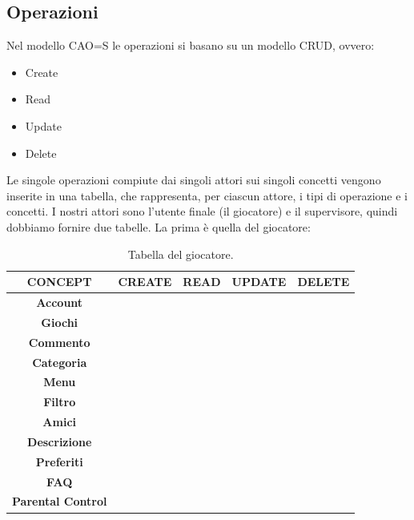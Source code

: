 \documentclass[../Report.tex]{subfiles}
\begin{document}
    \subsection{Operazioni}
    Nel modello CAO=S le operazioni si basano su un modello CRUD, ovvero:
    \begin{itemize}
        \item Create
        \item Read
        \item Update
        \item Delete
    \end{itemize}
    Le singole operazioni compiute dai singoli attori sui singoli concetti vengono inserite in una tabella, che rappresenta, per ciascun attore, i tipi di operazione e i concetti. I nostri attori sono l'utente finale (il giocatore) e il supervisore, quindi dobbiamo fornire due tabelle. La prima è quella del giocatore:

    \begin{table}[H]
        \begin{tabular}{|c|c|c|c|c|}
            \hline
            \textbf{CONCEPT} & \textbf{CREATE} & \textbf{READ} & \textbf{UPDATE} & \textbf{DELETE} \\
            \hline
            \textbf{Account} & \cellcolor{gray} & \cellcolor{gray} & \cellcolor{gray} & \cellcolor{gray}\\
            \hline
            \textbf{Giochi} & \cellcolor{red} & \cellcolor{green} & \cellcolor{red} & \cellcolor{red} \\
            \hline
            \textbf{Commento} & \cellcolor{gray} & \cellcolor{gray} & \cellcolor{gray} & \cellcolor{gray} \\
            \hline
            \textbf{Categoria} & \cellcolor{red} & \cellcolor{green} & \cellcolor{red} & \cellcolor{red} \\
            \hline
            \textbf{Menu} & \cellcolor{red} & \cellcolor{green} & \cellcolor{red} & \cellcolor{red} \\
            \hline
            \textbf{Filtro} & \cellcolor{red} & \cellcolor{green} & \cellcolor{green} & \cellcolor{red} \\
            \hline
            \textbf{Amici} & \cellcolor{gray} & \cellcolor{gray} & \cellcolor{red} & \cellcolor{gray} \\
            \hline
            \textbf{Descrizione} & \cellcolor{red} & \cellcolor{gray} & \cellcolor{red} & \cellcolor{red} \\
            \hline
            \textbf{Preferiti} & \cellcolor{red} & \cellcolor{gray} & \cellcolor{red} & \cellcolor{red} \\
            \hline
            \textbf{FAQ} & \cellcolor{gray} & \cellcolor{green} & \cellcolor{red} & \cellcolor{gray} \\
            \hline
            \textbf{Parental Control} & \cellcolor{red} & \cellcolor{red} & \cellcolor{red} & \cellcolor{red} \\
            \hline
        \end{tabular}
        \caption{\label{tab:giocatore}Tabella del giocatore.}
    \end{table}
\end{document}
